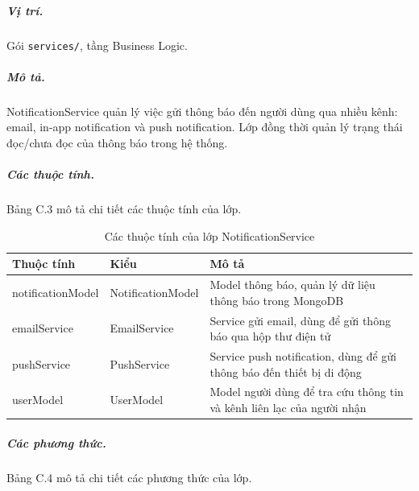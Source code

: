 \documentclass[../DoAn.tex]{subfiles}
\begin{document}
\subparagraph{Vị trí.} Gói \texttt{services/}, tầng Business Logic.

\subparagraph{Mô tả.} NotificationService quản lý việc gửi thông báo đến người dùng qua nhiều kênh: email, in-app notification và push notification. Lớp đồng thời quản lý trạng thái đọc/chưa đọc của thông báo trong hệ thống.

\subparagraph{Các thuộc tính.} Bảng C.3 mô tả chi tiết các thuộc tính của lớp.

\begin{table}[H]
\centering
\begin{tabular}{|p{4cm}|p{3.5cm}|p{5cm}|}
\hline
\textbf{Thuộc tính} & \textbf{Kiểu} & \textbf{Mô tả} \\ \hline
notificationModel & NotificationModel & Model thông báo, quản lý dữ liệu thông báo trong MongoDB \\ \hline
emailService & EmailService & Service gửi email, dùng để gửi thông báo qua hộp thư điện tử \\ \hline
pushService & PushService & Service push notification, dùng để gửi thông báo đến thiết bị di động \\ \hline
userModel & UserModel & Model người dùng để tra cứu thông tin và kênh liên lạc của người nhận \\ \hline
\end{tabular}
\caption{Các thuộc tính của lớp NotificationService}
\label{table:notification_service_attrs}
\end{table}

\subparagraph{Các phương thức.} Bảng C.4 mô tả chi tiết các phương thức của lớp.
\end{document}
